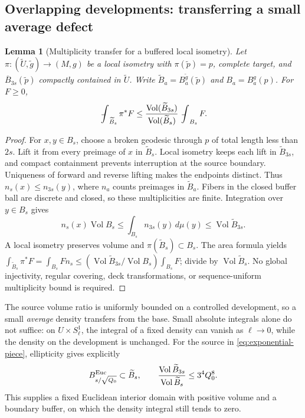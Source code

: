 \documentclass[a4paper,11pt]{article}
\numberwithin{equation}{section}
\newtheorem{lemma}[theorem]{Lemma}
\theoremstyle{definition}
\newcommand{\Vol}{\operatorname{Vol}}
\newcommand{\fint}{\mathop{\rlap{\,\raisebox{0.1ex}{\tiny$-$}}\int}\nolimits}
\begin{document}
\subsection{Overlapping developments: transferring a small average defect}
\begin{lemma}[Multiplicity transfer for a buffered local isometry]\label{lem:transport}
Let $\pi:(\widetilde U,\widetilde g)\to(M,g)$ be a local isometry with $\pi(\tilde p)=p$, complete target, and $\overline B_{3s}(\tilde p)$ compactly contained in $\widetilde U$. Write $\widetilde B_a=B_a^{\widetilde g}(\tilde p)$ and $B_a=B_a^g(p)$. For $F\ge0$,
\begin{equation}\label{eq:transport}
\fint_{\widetilde B_s}\pi^*F\le
\frac{\Vol(\widetilde B_{3s})}{\Vol(\widetilde B_s)}\fint_{B_s}F.
\end{equation}
\end{lemma}
\begin{proof}
For $x,y\in B_s$, choose a broken geodesic through $p$ of total length less than $2s$. Lift it from every preimage of $x$ in $\widetilde B_s$. Local isometry keeps each lift in $\widetilde B_{3s}$, and compact containment prevents interruption at the source boundary. Uniqueness of forward and reverse lifting makes the endpoints distinct. Thus $n_s(x)\le n_{3s}(y)$, where $n_a$ counts preimages in $\widetilde B_a$. Fibers in the closed buffer ball are discrete and closed, so these multiplicities are finite. Integration over $y\in B_s$ gives
\[
n_s(x)\Vol B_s\le\int_{B_s}n_{3s}(y)\,d\mu(y)\le\Vol\widetilde B_{3s}.
\]
A local isometry preserves volume and $\pi(\widetilde B_s)\subset B_s$. The area formula yields
$\int_{\widetilde B_s}\pi^*F=\int_{B_s}F n_s\le(\Vol\widetilde B_{3s}/\Vol B_s)\int_{B_s}F$; divide by $\Vol\widetilde B_s$. No global injectivity, regular covering, deck transformations, or sequence-uniform multiplicity bound is required.
\end{proof}

The source volume ratio is uniformly bounded on a controlled development, so a small \emph{average} density transfers from the base. Small absolute integrals alone do not suffice: on $U\times S^1_\ell$, the integral of a fixed density can vanish as $\ell\to0$, while the density on the development is unchanged.
For the source in \eqref{eq:exponential-piece}, ellipticity gives explicitly
\begin{equation}\label{eq:source-volume-ratio}
B^{\rm Euc}_{s/\sqrt{Q_0}}\subset\widetilde B_s,
\qquad \frac{\Vol\widetilde B_{3s}}{\Vol\widetilde B_s}\le3^4Q_0^8.
\end{equation}
This supplies a fixed Euclidean interior domain with positive volume and a boundary buffer, on which the density integral still tends to zero.
\end{document}
